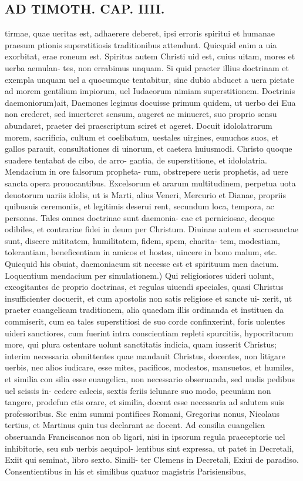 \documentclass{article}
\begin{document}
\begin{pages}
\section*{AD TIMOTH. CAP. IIII. }
\marginpar{[ p.505 ]}\pstart tirmae, quae ueritas est, adhaerere deberet, ipsi erroris spiritui et humanae praesum ptionis superstitiosis traditionibus attendunt. Quicquid enim a uia exorbitat, erae roneum est. Spiritus autem Christi uid est, cuius uitam, mores et uerba aemulan- tes, non errabimus unquam. Si quid praeter illius doctrinam et exempla unquam uel a quocumque tentabitur, sine dubio abducet a uera pietate ad morem gentilium impiorum, uel Iudaeorum nimiam superstitionem. Doctrinis daemoniorum)ait, Daemones legimus docuisse primum quidem, ut uerbo dei Eua non crederet, sed inuerteret sensum, augeret ac minueret, suo proprio sensu abundaret, praeter dei praescriptum sciret et ageret. Docuit idololatrarum morem, sacrificia, cultum et coelibatum, uestales uirgines, eunuchos suos, et gallos parauit, consultationes di uinorum, et caetera huiusmodi. Christo quoque suadere tentabat de cibo, de arro- gantia, de superstitione, et idololatria. Mendacium in ore falsorum propheta- rum, obstrepere ueris prophetis, ad uere sancta opera prouocantibus. Excelsorum et ararum multitudinem, perpetua uota deuotorum uariis idolis, ut is Marti, alius Veneri, Mercurio et Dianae, propriis quibusuis ceremoniis, et legitimis deserui rent, secundum loca, tempora, ac personas. Tales omnes doctrinae sunt daemonia- cae et perniciosae, deoque odibiles, et contrariae fidei in deum per Christum. Diuinae autem et sacrosanctae sunt, discere mititatem, humilitatem, fidem, spem, charita- tem, modestiam, tolerantiam, beneficentiam in amicos et hostes, uincere in bono malum, etc. Quicquid his obuiat, daemoniacum sit necesse est et spirituum men dacium. Loquentium mendacium per simulationem.) Qui religiosiores uideri uolunt, excogitantes de proprio doctrinas, et regulas uiuendi speciales, quasi Christus insufficienter docuerit, et cum apostolis non satis religiose et sancte ui- xerit, ut praeter euangelicam traditionem, alia quaedam illis ordinanda et instituen da commiserit, cum ea tales superstitiosi de suo corde confinxerint, foris uolentes uideri sanctiores, cum fuerint intra conscientiam repleti spurcitiis, hypocritarum more, qui plura ostentare uolunt sanctitatis indicia, quam iusserit Christus; interim necessaria obmittentes quae mandauit Christus, docentes, non litigare uerbis, nec alios iudicare, esse mites, pacificos, modestos, mansuetos, et humiles, et similia con silia esse euangelica, non necessario obseruanda, sed nudis pedibus uel scissis in- cedere calceis, sextis feriis ielunare suo modo, pecuniam non tangere, prodefun ctis orare, et similia, docent esse necessaria ad salutem suis professoribus. Sic enim summi pontifices Romani, Gregorius nonus, Nicolaus tertius, et Martinus quin tus declarant ac docent. Ad consilia euangelica obseruanda Franciscanos non ob ligari, nisi in ipsorum regula praeceptorie uel inhibitorie, seu sub uerbis aequipol- lentibus sint expressa, ut patet in Decretali, Exiit qui seminat, libro sexto. Simili- ter Clemens in Decretali, Exiui de paradiso. Consentientibus in his et similibus quatuor magistris Parisiensibus, 
\end{pages}
\end{document}
